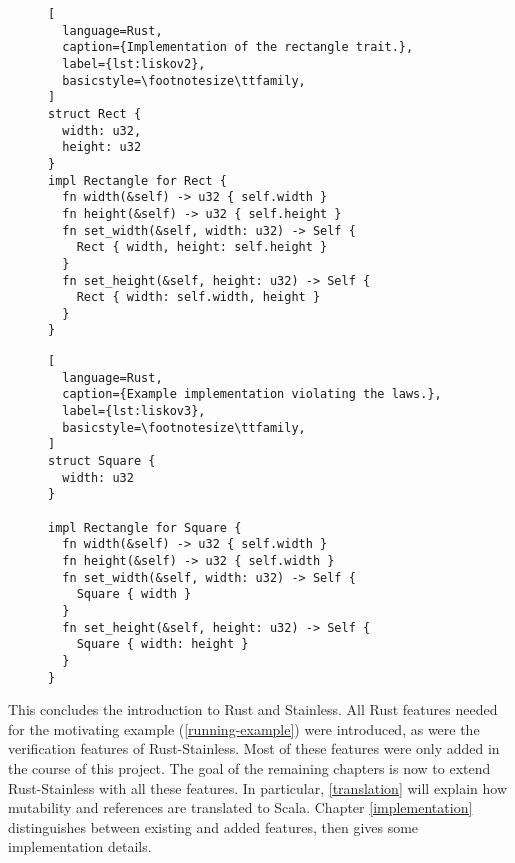 \begin{figure}[hbt]
\noindent \begin{minipage}[t]{.49\textwidth}
\begin{lstlisting}[
  language=Rust,
  caption={Implementation of the rectangle trait.},
  label={lst:liskov2},
  basicstyle=\footnotesize\ttfamily,
]
struct Rect {
  width: u32,
  height: u32
}
impl Rectangle for Rect {
  fn width(&self) -> u32 { self.width }
  fn height(&self) -> u32 { self.height }
  fn set_width(&self, width: u32) -> Self {
    Rect { width, height: self.height }
  }
  fn set_height(&self, height: u32) -> Self {
    Rect { width: self.width, height }
  }
}
\end{lstlisting}
\end{minipage}\hfill
\begin{minipage}[t]{.49\textwidth}
\begin{lstlisting}[
  language=Rust,
  caption={Example implementation violating the laws.},
  label={lst:liskov3},
  basicstyle=\footnotesize\ttfamily,
]
struct Square {
  width: u32
}

impl Rectangle for Square {
  fn width(&self) -> u32 { self.width }
  fn height(&self) -> u32 { self.width }
  fn set_width(&self, width: u32) -> Self {
    Square { width }
  }
  fn set_height(&self, height: u32) -> Self {
    Square { width: height }
  }
}
\end{lstlisting}
\end{minipage}
\end{figure}

\noindent This concludes the introduction to Rust and Stainless. All Rust
features needed for the motivating example (\autoref{running-example}) were
introduced, as were the verification features of Rust-Stainless.  Most of these
features were only added in the course of this project. The goal of the
remaining chapters is now to extend Rust-Stainless with all these features. In
particular, \autoref{translation} will explain how mutability and 
references are translated to Scala. Chapter \ref{implementation} distinguishes
between existing and added features, then gives some implementation details.


